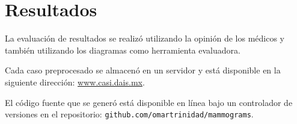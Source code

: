 \chapter{Resultados}

La evaluación de resultados se realizó utilizando la opinión de los médicos y 
también utilizando los diagramas como herramienta evaluadora.

Cada caso preprocesado se almacenó en un servidor y está disponible en la siguiente
dirección: \url{www.casi.dais.mx}.

El código fuente que se generó está disponible en línea bajo un controlador de
versiones en el repositorio: \texttt{github.com/omartrinidad/mammograms}.
